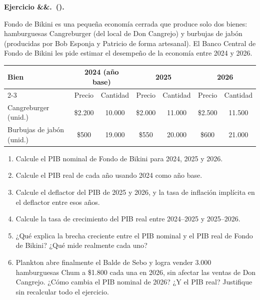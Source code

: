 \documentclass[11pt]{article}
\newcounter{ejercicio}
\newcommand{\ejercicio}[1][]{%
  \stepcounter{ejercicio}%
  \bigskip\noindent\textbf{Ejercicio \arabic{ejercicio}\ifx&#1&\relax.\else\ (#1).\fi}\ %
}
\newenvironment{partes}
  {\begin{enumerate}[label=(\alph*), leftmargin=1.5cm]}
  {\end{enumerate}}
\newenvironment{tabladatos}
  {\begin{center}}
  {\end{center}}
\begin{document}
\ejercicio
Fondo de Bikini es una pequeña economía cerrada que produce solo dos bienes: hamburguesas Cangreburger (del local de Don Cangrejo) y burbujas de jabón (producidas por Bob Esponja y Patricio de forma artesanal). El Banco Central de Fondo de Bikini les pide estimar el desempeño de la economía entre 2024 y 2026.

\begin{tabladatos}
\begin{tabular}{lcccccc}
\hline\hline
\multirow{2}{*}{\textbf{Bien}} & \multicolumn{2}{c}{\textbf{2024 (año base)}} & \multicolumn{2}{c}{\textbf{2025}} & \multicolumn{2}{c}{\textbf{2026}} \\
\cline{2-3} \cline{4-5} \cline{6-7}
 & Precio & Cantidad & Precio & Cantidad & Precio & Cantidad \\
\hline
Cangreburger (unid.) & \$2.200 & 10.000 & \$2.000 & 11.000 & \$2.500 & 11.500 \\
Burbujas de jabón (unid.) & \$500 & 19.000 & \$550 & 20.000 & \$600 & 21.000 \\
\hline\hline
\end{tabular}
\end{tabladatos}

\begin{partes}
  \item Calcule el PIB nominal de Fondo de Bikini para 2024, 2025 y 2026.
  \item Calcule el PIB real de cada año usando 2024 como año base.
  \item Calcule el deflactor del PIB de 2025 y 2026, y la tasa de inflación implícita en el deflactor entre esos años.
  \item Calcule la tasa de crecimiento del PIB real entre 2024--2025 y 2025--2026.
  \item ¿Qué explica la brecha creciente entre el PIB nominal y el PIB real de Fondo de Bikini? ¿Qué mide realmente cada uno?
  \item Plankton abre finalmente el Balde de Sebo y logra vender 3.000 hamburguesas Chum a \$1.800 cada una en 2026, sin afectar las ventas de Don Cangrejo. ¿Cómo cambia el PIB nominal de 2026? ¿Y el PIB real? Justifique sin recalcular todo el ejercicio.
\end{partes}
\end{document}
